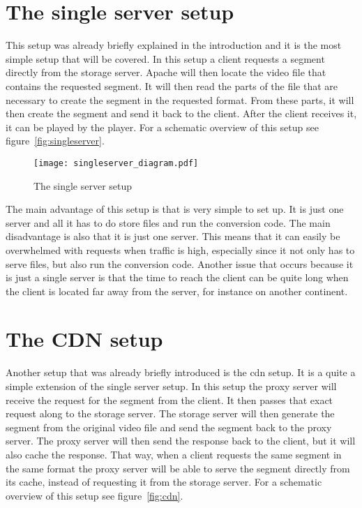 \documentclass[twoside,openright]{uva-bachelor-thesis}
\begin{document}
\section{The single server setup}
This setup was already briefly explained in the introduction and it is the most
simple setup that will be covered. In this setup a client requests a segment
directly from the storage server. Apache will then locate the video file
that contains the requested segment. It will then read the parts of the file
that are necessary to create the segment in the requested format. From these
parts, it will then create the segment and send it back to the client. After the
client receives it, it can be played by the player. For a schematic overview of
this setup see figure~\vref{fig:singleserver}.

\begin{figure}[h]
    \texttt{[image: singleserver\_diagram.pdf]}
    \caption{The single server setup}\label{fig:singleserver}
\end{figure}

The main advantage of this setup is that is very simple to set up. It is just
one server and all it has to do store files and run the conversion code. The
main disadvantage is also that it is just one server. This means that it can
easily be overwhelmed with requests when traffic is high, especially since it
not only has to serve files, but also run the conversion code. Another issue
that occurs because it is just a single server is that the time to reach the
client can be quite long when the client is located far away from the server,
for instance on another continent.



\section{The CDN setup}
Another setup that was already briefly introduced is the \gls{cdn} setup. It is
a quite a simple extension of the single server setup. In this setup the proxy
server will receive the request for the segment from the client. It then passes
that exact request along to the storage server. The storage server will then
generate the segment from the original video file and send the segment back to
the proxy server.  The proxy server will then send the response back to the
client, but it will also cache the response. That way, when a client requests
the same segment in the same format the proxy server will be able to serve the
segment directly from its cache, instead of requesting it from the storage
server. For a schematic overview of this setup see figure~\vref{fig:cdn}.
\end{document}

